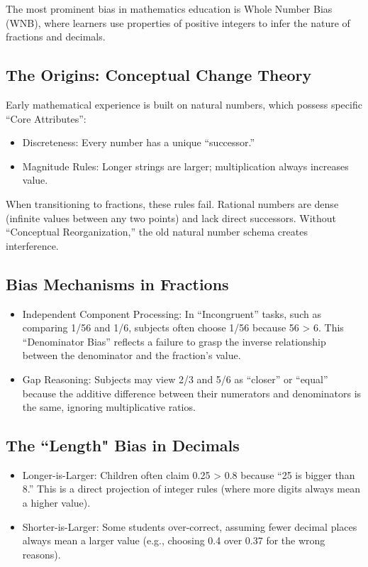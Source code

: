 The most prominent bias in mathematics education is Whole Number Bias (WNB), where learners use properties of positive integers to infer the nature of fractions and decimals\cite{bonsel2025}.

\subsection{The Origins: Conceptual Change Theory}

Early mathematical experience is built on natural numbers, which possess specific “Core Attributes”:
\begin{itemize}
    \item Discreteness: Every number has a unique “successor.”
    \item Magnitude Rules: Longer strings are larger; multiplication always increases value.
\end{itemize}
When transitioning to fractions, these rules fail. Rational numbers are dense (infinite values between any two points) and lack direct successors. Without “Conceptual Reorganization,” the old natural number schema creates interference\cite{alibali2015b}.

\subsection{Bias Mechanisms in Fractions}

\begin{itemize}
    \item Independent Component Processing: In “Incongruent” tasks, such as comparing 1/56 and 1/6, subjects often choose 1/56 because 56 > 6. This “Denominator Bias” reflects a failure to grasp the inverse relationship between the denominator and the fraction’s value\cite{alibali2015b}.
    \item Gap Reasoning: Subjects may view 2/3 and 5/6 as “closer” or “equal” because the additive difference between their numerators and denominators is the same, ignoring multiplicative ratios\cite{alonsodaz2018}.
\end{itemize}

\subsection{The ``Length" Bias in Decimals}

\begin{itemize}
    \item Longer-is-Larger: Children often claim 0.25 > 0.8 because “25 is bigger than 8.” This is a direct projection of integer rules (where more digits always mean a higher value)\cite{researchgate2025}.
    \item Shorter-is-Larger: Some students over-correct, assuming fewer decimal places always mean a larger value (e.g., choosing 0.4 over 0.37 for the wrong reasons)\cite{researchgate2025}.
\end{itemize}

